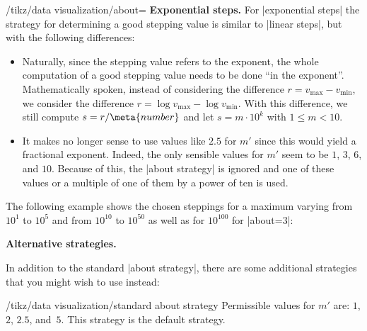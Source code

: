 \begin{key}{/tikz/data visualization/about=}
    \medskip
    \textbf{Exponential steps.}
    For |exponential steps| the strategy for determining a good stepping value is similar to |linear steps|, but with the following differences:
    \begin{itemize}
        \item Naturally, since the stepping value refers to the exponent, the whole computation of a good stepping value needs to be done ``in the exponent''. Mathematically spoken, instead of considering the difference $r = v_{\max} - v_{\min}$, we consider the difference $r = \log v_{\max} - \log v_{\min}$. With this difference, we still compute $s = r / \meta{number}$ and let $s = m \cdot 10^k$ with $1 \le m < 10$.
        \item It makes no longer sense to use values like $2.5$ for $m'$ since this would yield a fractional exponent. Indeed, the only sensible values for $m'$ seem to be $1$, $3$, $6$, and $10$. Because of this, the |about strategy| is ignored and one of these values or a multiple of one of them by a power of ten is used.
    \end{itemize}

    The following example shows the chosen steppings for a maximum varying from
    $10^1$ to $10^5$ and from $10^{10}$ to $10^{50}$ as well as for $10^{100}$
    for |about=3|:

    \medskip


    \medskip
    \textbf{Alternative strategies.}

    In addition to the standard |about strategy|, there are some additional strategies that you might wish to use instead:

    \begin{key}{/tikz/data visualization/standard about strategy}
        Permissible values for $m'$ are: $1$, $2$, $2.5$, and~$5$. This strategy is the default strategy.
    \end{key}


\end{key}
